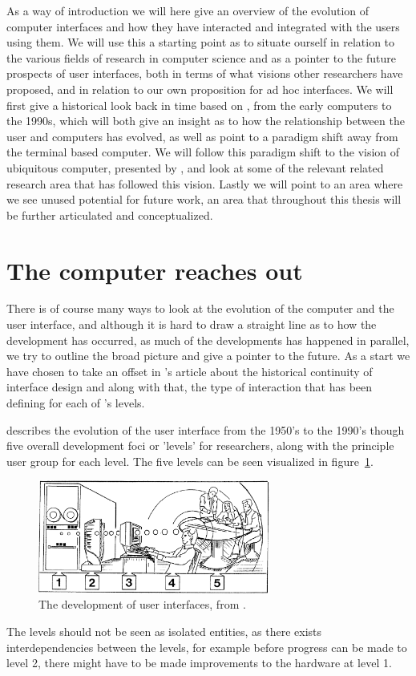 As a way of introduction we will here give an overview of the evolution of computer interfaces and how they have interacted and integrated with the users using them.
We will use this a starting point as to situate ourself in relation to the various fields of research in computer science and as a pointer to the future prospects of user interfaces, both in terms of what visions other researchers have proposed, and in relation to our own proposition for ad hoc interfaces.
We will first give a historical look back in time based on \citet{grudin1990computer}, from the early computers to the 1990s, which will both give an insight as to how the relationship between the user and computers has evolved, as well as point to a paradigm shift away from the terminal based computer.
We will follow this paradigm shift to the vision of ubiquitous computer, presented by \citet{weiser1991computer}, and look at some of the relevant related research area that has followed this vision.
Lastly we will point to an area where we see unused potential for future work, an area that throughout this thesis will be further articulated and conceptualized.   

\section{The computer reaches out}
There is of course many ways to look at the evolution of the computer and the user interface, and although it is hard to draw a straight line as to how the development has occurred, as much of the developments has happened in parallel, we try to outline the broad picture and give a pointer to the future.
As a start we have chosen to take an offset in \citeauthor{grudin1990computer}'s article about the historical continuity of interface design \citep{grudin1990computer} and along with that, the type of interaction that has been defining for each of \citeauthor{grudin1990computer}'s levels.

\citeauthor{grudin1990computer} describes the evolution of the user interface from the 1950's to the 1990's though five overall development foci or 'levels' for researchers, along with the principle user group for each level.
The five levels can be seen visualized in figure~\ref{foci-interface}.

\begin{figure}[h]
	\centering
  		\includegraphics[width=3in]{figures/foci-interface}
	\caption[The development of user interfaces \citep{grudin1990computer}.]
   {The development of user interfaces, from \citep{grudin1990computer}.}
   \label{foci-interface}
\end{figure}
The levels should not be seen as isolated entities, as there exists interdependencies between the levels, for example before progress can be made to level 2, there might have to be made improvements to the hardware at level 1.

